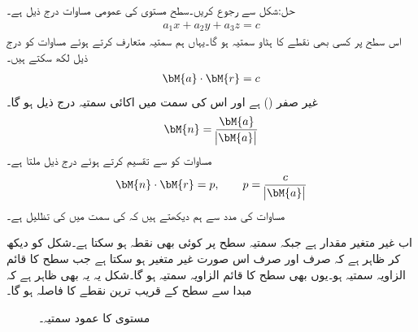 حل:شکل  سے رجوع کریں۔سطح مستوی کی عمومی مساوات درج ذیل ہے۔
\begin{align}\label{مساوات_الجبرا_سیدھی_سطح_الف}
a_1x+a_2y+a_3z=c
\end{align} 
اس سطح پر کسی بھی نقطے کا ہٹاو سمتیہ  ہو گا۔یہاں ہم سمتیہ  متعارف کرتے ہوئے  مساوات  کو درج ذیل لکھ سکتے ہیں۔
\begin{align}\label{مساوات_الجبرا_سیدھی_سطح_ب}
\bM{a}\cdot\bM{r}=c
\end{align}
 غیر صفر () ہے اور اس کی سمت میں اکائی سمتیہ  درج ذیل ہو گا۔
\begin{align*}
\bM{n}=\frac{\bM{a}}{\abs{\bM{a}}}
\end{align*}
مساوات  کو  سے تقسیم کرتے ہوئے درج ذیل ملتا ہے۔
\begin{align}
\bM{n}\cdot \bM{r}=p,\quad \quad  p=\frac{c}{\abs{\bM{a}}}
\end{align}
مساوات  کی مدد سے ہم دیکھتے ہیں کہ  کی سمت میں  کی  تظلیل   ہے۔

اب  غیر متغیر مقدار ہے جبکہ سمتیہ  سطح پر کوئی بھی نقطہ ہو سکتا ہے۔شکل کو دیکھ کر ظاہر ہے کہ  صرف اور صرف اس صورت غیر متغیر ہو سکتا ہے جب  سطح کا قائم الزاویہ سمتیہ ہو۔یوں  بھی سطح کا قائم الزاویہ سمتیہ ہو گا۔شکل یہ یہ بھی ظاہر ہے کہ مبدا سے سطح کے قریب ترین نقطے کا فاصلہ  ہو گا۔
\begin{figure}
\centering
{}
\caption{مستوی کا عمود سمتیہ۔}
\label{شکل_سمتیہ_سطحی_قائمہ_الزاویہ}
\end{figure}

